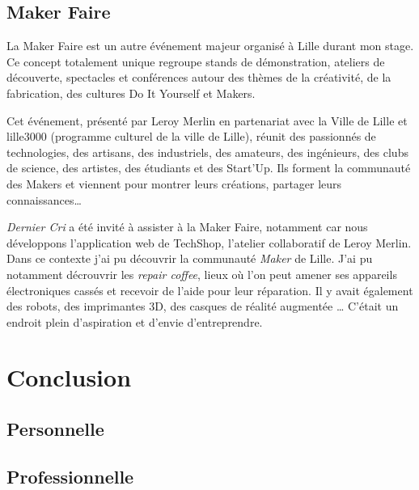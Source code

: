 \documentclass[12pt,a4paper]{article}
\begin{document}
  \bigskip

  \subsection{Maker Faire}\label{maker-faire}

  \bigskip

  La Maker Faire est un autre événement majeur organisé à Lille durant mon
  stage. Ce concept totalement unique regroupe stands de démonstration,
  ateliers de découverte, spectacles et conférences autour des thèmes de
  la créativité, de la fabrication, des cultures Do It Yourself et Makers.

  \bigskip

  Cet événement, présenté par Leroy Merlin en partenariat avec la Ville de
  Lille et lille3000 (programme culturel de la ville de Lille), réunit des
  passionnés de technologies, des artisans, des industriels, des amateurs,
  des ingénieurs, des clubs de science, des artistes, des étudiants et des
  Start'Up. Ils forment la communauté des Makers et viennent pour montrer
  leurs créations, partager leurs connaissances\ldots{}

  \bigskip

  \emph{Dernier Cri} a été invité à assister à la Maker Faire, notamment
  car nous développons l'application web de TechShop, l'atelier
  collaboratif de Leroy Merlin. Dans ce contexte j'ai pu découvrir la
  communauté \emph{Maker} de Lille. J'ai pu notamment décrouvrir les
  \emph{repair coffee}, lieux où l'on peut amener ses appareils
  électroniques cassés et recevoir de l'aide pour leur réparation. Il y
  avait également des robots, des imprimantes 3D, des casques de réalité
  augmentée \ldots{} C'était un endroit plein d'aspiration et d'envie
  d'entreprendre.

  \newpage

  \section{Conclusion}\label{conclusion-2}

  \subsection{Personnelle}\label{personnelle}

  \subsection{Professionnelle}\label{professionnelle}
\end{document}

